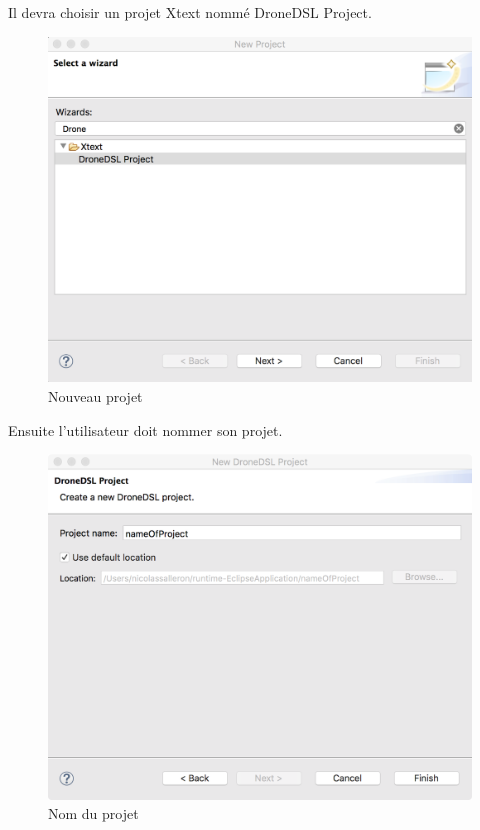 \documentclass[12pt]{article}
\begin{document}
        Il devra choisir un projet Xtext nommé DroneDSL Project.
        
        \begin{figure}[!h]
        \centering
        \includegraphics[scale=0.40]{05.png}
        \caption{Nouveau projet}
        \end{figure}
        
        Ensuite l'utilisateur doit nommer son projet.
        
        \begin{figure}[!h]
        \centering
        \includegraphics[scale=0.40]{06.png}
        \caption{Nom du projet}
        \end{figure}
        
\end{document}
